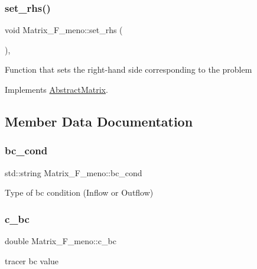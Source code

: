 \subsubsection{\texorpdfstring{set\+\_\+rhs()}{set\_rhs()}}
{\footnotesize\ttfamily void Matrix\+\_\+\+F\+\_\+meno\+::set\+\_\+rhs (\begin{DoxyParamCaption}{ }\end{DoxyParamCaption})\hspace{0.3cm}{\ttfamily [override]}, {\ttfamily [virtual]}}

Function that sets the right-\/hand side corresponding to the problem 

Implements \hyperlink{classAbstractMatrix_a1334661de25f76dc65f16538c167a03c}{Abstract\+Matrix}.



\subsection{Member Data Documentation}
\mbox{\label{classMatrix__F__meno_a376fb6461d3178c01eecabe7d51901dc}} 
\subsubsection{\texorpdfstring{bc\+\_\+cond}{bc\_cond}}
{\footnotesize\ttfamily std\+::string Matrix\+\_\+\+F\+\_\+meno\+::bc\+\_\+cond\hspace{0.3cm}{\ttfamily [private]}}

Type of bc condition (Inflow or Outflow) \mbox{\label{classMatrix__F__meno_ac51bf5308b52c9ce9a726cafd0485928}} 
\subsubsection{\texorpdfstring{c\+\_\+bc}{c\_bc}}
{\footnotesize\ttfamily double Matrix\+\_\+\+F\+\_\+meno\+::c\+\_\+bc\hspace{0.3cm}{\ttfamily [private]}}

tracer bc value \mbox{\label{classMatrix__F__meno_a635dd00a661ca2453da2392f98422b61}} 
